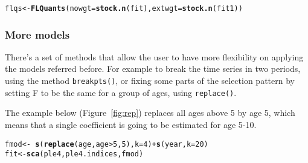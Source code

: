 \documentclass[a4paper,english,10pt]{article}\usepackage[]{graphicx}\usepackage[]{color}
\makeatletter
\newcommand{\hlnum}[1]{\textcolor[rgb]{0.686,0.059,0.569}{#1}}%
\newcommand{\hlopt}[1]{\textcolor[rgb]{0,0,0}{#1}}%
\newcommand{\hlstd}[1]{\textcolor[rgb]{0.345,0.345,0.345}{#1}}%
\newcommand{\hlkwb}[1]{\textcolor[rgb]{0.69,0.353,0.396}{#1}}%
\newcommand{\hlkwc}[1]{\textcolor[rgb]{0.333,0.667,0.333}{#1}}%
\newcommand{\hlkwd}[1]{\textcolor[rgb]{0.737,0.353,0.396}{\textbf{#1}}}%
\newenvironment{kframe}{%
 \def\at@end@of@kframe{}%
 \ifinner\ifhmode%
  \def\at@end@of@kframe{\end{minipage}}%
  \begin{minipage}{\columnwidth}%
 \fi\fi%
 \def\FrameCommand##1{\hskip\@totalleftmargin \hskip-\fboxsep
 \colorbox{shadecolor}{##1}\hskip-\fboxsep
     \hskip-\linewidth \hskip-\@totalleftmargin \hskip\columnwidth}%
 \MakeFramed {\advance\hsize-\width
   \@totalleftmargin\z@ \linewidth\hsize
   \@setminipage}}%
 {\par\unskip\endMakeFramed%
 \at@end@of@kframe}
\newenvironment{knitrout}{}{} %
\newcommand{\code}[1]{{\texttt{#1}}}
\makeatother
\begin{document}
\begin{knitrout}
\begin{kframe}
{\ttfamily\noindent\bfseries{}}\begin{alltt}
\hlstd{flqs} \hlkwb{<-} \hlkwd{FLQuants}\hlstd{(}\hlkwc{nowgt}\hlstd{=}\hlkwd{stock.n}\hlstd{(fit),} \hlkwc{extwgt}\hlstd{=}\hlkwd{stock.n}\hlstd{(fit1))}
\end{alltt}


{\ttfamily\noindent\bfseries{}}\end{kframe}
\end{knitrout}

\begin{knitrout}
\color{fgcolor}\begin{kframe}


{\ttfamily\noindent\bfseries{}}\end{kframe}
\end{knitrout}

\subsubsection{More models}

There's a set of methods that allow the user to have more flexibility on applying the models referred before. For example to break the time series in two periods, using the method \code{breakpts()}, or fixing some parts of the selection pattern by setting F to be the same for a group of ages, using \code{replace()}.

The example below (Figure~\ref{fig:rep}) replaces all ages above 5 by age 5, which means that a single coefficient is going to be estimated for age 5-10.

\begin{knitrout}
\color{fgcolor}\begin{kframe}
\begin{alltt}
\hlstd{fmod} \hlkwb{<-} \hlopt{~} \hlkwd{s}\hlstd{(}\hlkwd{replace}\hlstd{(age, age}\hlopt{>}\hlnum{5}\hlstd{,} \hlnum{5}\hlstd{),} \hlkwc{k}\hlstd{=}\hlnum{4}\hlstd{)} \hlopt{+} \hlkwd{s}\hlstd{(year,} \hlkwc{k}\hlstd{=}\hlnum{20}\hlstd{)}
\hlstd{fit} \hlkwb{<-} \hlkwd{sca}\hlstd{(ple4, ple4.indices, fmod)}
\end{alltt}


{\ttfamily\noindent\bfseries{}}\end{kframe}
\end{knitrout}
\end{document}
